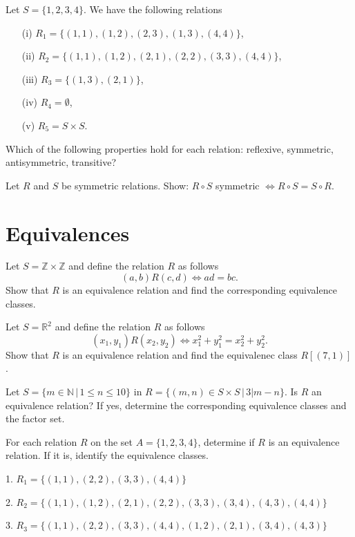 \documentclass[11pt,paper=b5,footinclude,headinclude]{scrbook} %
\theoremstyle{remark}
\theoremstyle{definition} %
\theoremstyle{theorem} %
\newtheorem{ex}{Exercise\hypertarget{sol:\theex}}[chapter]
\begin{document}
\begin{ex}
Let  $S=\{1,2,3,4\}$. We have the following relations
\begin{enumerate}
\item[(i)] $R_1= \{(1,1),(1,2),(2,3), (1,3), (4,4)\}$,
\item[(ii)] $R_2= \{(1,1),(1,2),(2,1), (2,2), (3,3), (4,4)\}$,
\item[(iii)] $R_3= \{(1,3),(2,1)\}$,
\item[(iv)] $R_4= \emptyset$,
\item[(v)] $R_5= S\times S$.
\end{enumerate}
Which of the following properties hold for each relation: reflexive, symmetric, antisymmetric, transitive?

\end{ex}
\begin{ex}
 Let $R$ and $S$ be symmetric relations. Show: $R\circ S$ symmetric $\Leftrightarrow R\circ S = S \circ R$.

\end{ex}



\section{Equivalences}
\begin{ex}
 Let $S = \mathbb{Z}\times \mathbb{Z}$ and define the relation $R$ as follows
$$(a,b)R(c,d)\Leftrightarrow ad = bc.$$
Show that $R$ is an equivalence relation  and find the corresponding equivalence classes.

\end{ex}
\begin{ex}
 Let  $S =  \mathbb{R}^2$ and define the relation $R$ as follows
$$(x_1,y_1)R(x_2,y_2)\Leftrightarrow x_1^2 + y_1^2 = x_2^2 + y_2^2.$$
Show that $R$ is an equivalence relation  and find the equivalenec class $R[(7,1)]$.


\end{ex}
\begin{ex}
 Let $S= \{m\in \mathbb{N}\,|\, 1\leq n \leq 10\}$ in $R=\{(m,n)\in S\times S\,|\, 3|m-n\}$.
Is $R$ an equivalence relation? If yes, determine the corresponding equivalence classes and the factor set.
\end{ex}

\begin{ex}
For each relation \( R \) on the set \( A = \{1, 2, 3, 4\} \), determine if \( R \) is an equivalence relation. If it is, identify the equivalence classes.

1. \( R_1 = \{(1, 1), (2, 2), (3, 3), (4, 4)\} \)

2. \( R_2 = \{(1, 1), (1, 2), (2, 1), (2, 2), (3, 3), (3, 4), (4, 3), (4, 4)\} \)

3. \( R_3 = \{(1, 1), (2, 2), (3, 3), (4, 4), (1, 2), (2, 1), (3, 4), (4, 3)\} \)
\end{ex}
\end{document}
